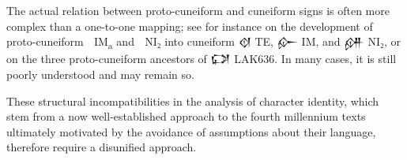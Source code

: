 The actual relation between proto-cuneiform and cuneiform signs is
often more complex than a one-to-one mapping; see for
instance \cite[217]{Wagensonner2016} on the development of
proto-cuneiform {\oraccpc 𒡡} IM\textsubscript{a} and {\oraccpc 𒥋} NI₂
into cuneiform {\oraccnoto 𒋼} TE, {\oraccnoto 𒅎} IM, and {\oraccnoto
𒉎} NI₂, or \cite[220]{Wagensonner2016} on the three proto-cuneiform
ancestors of {\oraccnoto 𒔌} LAK636. In many cases, it is still poorly
understood and may remain so.

These structural incompatibilities in the analysis of character
identity, which stem from a now well-established approach to the
fourth millennium texts ultimately motivated by the avoidance of
assumptions about their language, therefore require a disunified
approach.
